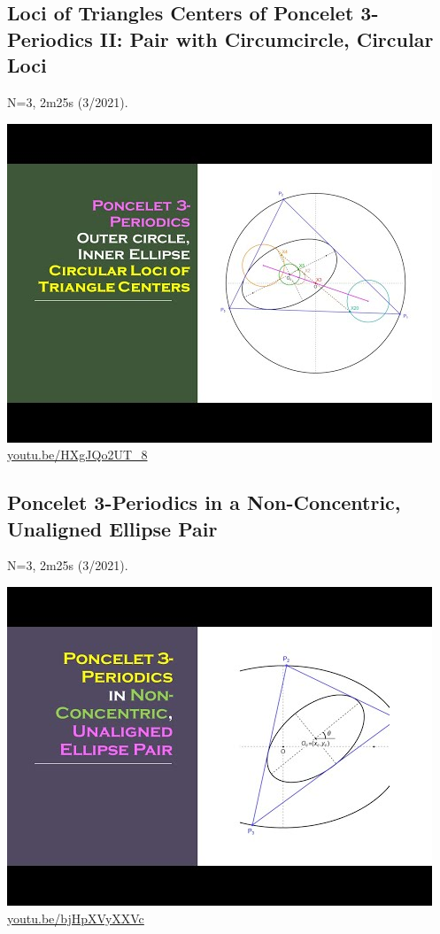\documentclass[12pt]{amsart}
\begin{document}
\subsection{Loci of Triangles Centers of Poncelet 3-Periodics II: Pair with Circumcircle, Circular Loci}
\label{vid:HXgJQo2UT_8}
\noindent N=3, 2m25s (3/2021). 
\begin{center}\includegraphics[width=.5\textwidth]{pics/HXgJQo2UT_8.jpg} \\ 
\href{https://youtu.be/HXgJQo2UT_8}{\url{youtu.be/HXgJQo2UT\_8}}\end{center}
% 

\subsection{Poncelet 3-Periodics in a Non-Concentric, Unaligned Ellipse Pair}
\label{vid:bjHpXVyXXVc}
\noindent N=3, 2m25s (3/2021). 
\begin{center}\includegraphics[width=.5\textwidth]{pics/bjHpXVyXXVc.jpg} \\ 
\href{https://youtu.be/bjHpXVyXXVc}{\url{youtu.be/bjHpXVyXXVc}}\end{center}
% 
\end{document}
